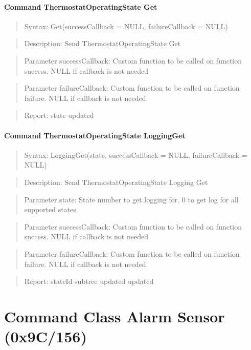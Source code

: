 \paragraph{Command ThermostatOperatingState Get}
\begin{quote}Syntax: Get(successCallback = NULL, failureCallback = NULL)\end{quote}
\begin{quote}Description: Send ThermostatOperatingState Get\end{quote}
\begin{quote}Parameter successCallback: Custom function to be called on function success. NULL if callback is not needed\end{quote}
\begin{quote}Parameter failureCallback: Custom function to be called on function failure. NULL if callback is not needed\end{quote}
\begin{quote}Report: state updated\end{quote}

\paragraph{Command ThermostatOperatingState LoggingGet}
\begin{quote}Syntax: LoggingGet(state, successCallback = NULL, failureCallback = NULL)\end{quote}
\begin{quote}Description: Send ThermostatOperatingState Logging Get\end{quote}
\begin{quote}Parameter state: State number to get logging for. 0 to get log for all supported states\end{quote}
\begin{quote}Parameter successCallback: Custom function to be called on function success. NULL if callback is not needed\end{quote}
\begin{quote}Parameter failureCallback: Custom function to be called on function failure. NULL if callback is not needed\end{quote}
\begin{quote}Report: stateId subtree updated updated\end{quote}


\section{Command Class Alarm Sensor (0x9C/156)}

